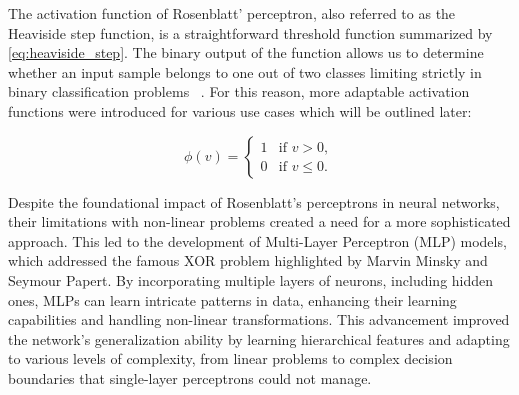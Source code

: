 The activation function of Rosenblatt' perceptron, also referred to as the Heaviside step function, is a straightforward threshold function summarized by \cref{eq:heaviside_step}.
The binary output of the function allows us to determine whether an input sample belongs to one out of two classes limiting strictly in binary classification problems
~\cite{popescuMultilayerPerceptronNeural2009}. For this reason, more adaptable activation functions were introduced for various use cases which will be outlined later:

\begin{equation}
    \phi(v) =
    \begin{cases}
        1 & \text{if } v > 0,    \\
        0 & \text{if } v \leq 0.
    \end{cases}
    \label{eq:heaviside_step}
\end{equation}




Despite the foundational impact of Rosenblatt's perceptrons in neural networks, their limitations with non-linear problems created a need for a more sophisticated
approach. This led to the development of Multi-Layer Perceptron (MLP) models, which addressed the famous XOR problem highlighted by Marvin Minsky and Seymour
Papert\cite{minskyPerceptronsReissue19882017}. By incorporating multiple layers of neurons, including hidden ones, MLPs can learn intricate patterns in data,
enhancing their learning capabilities and handling non-linear transformations. This advancement improved the network's generalization ability by learning hierarchical
features and adapting to various levels of complexity, from linear problems to complex decision boundaries that single-layer perceptrons could not manage.

